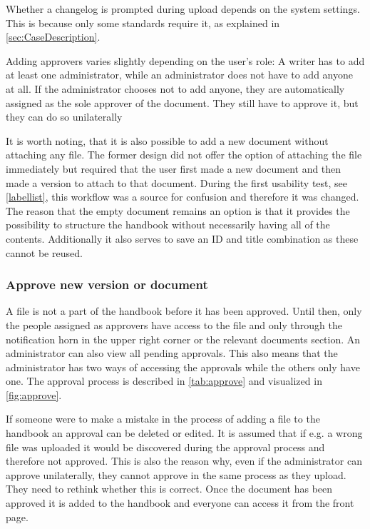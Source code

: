 


Whether a changelog is prompted during upload depends on the system settings.
This is because only some standards require it, as explained in \cref{sec:CaseDescription}.

Adding approvers varies slightly depending on the user's role:
A writer has to add at least one administrator, while an administrator does not have to add anyone at all.
If the administrator chooses not to add anyone, they are automatically assigned as the sole approver of the document.
They still have to approve it, but they can do so unilaterally

It is worth noting, that it is also possible to add a new document without attaching any file.
The former design did not offer the option of attaching the file immediately but required that the user first made a new document and then made a version to attach to that document.
During the first usability test, see \cref{labellist}, this workflow was a source for confusion and therefore it was changed.
The reason that the empty document remains an option is that it provides the possibility to structure the handbook without necessarily having all of the contents.
Additionally it also serves to save an ID and title combination as these cannot be reused. 

\subsubsection{Approve new version or document} \label{sec:approve}
A file is not a part of the handbook before it has been approved.
Until then, only the people assigned as approvers have access to the file and only through the notification horn in the upper right corner or the relevant documents section.
An administrator can also view all pending approvals.
This also means that the administrator has two ways of accessing the approvals while the others only have one.
The approval process is described in \cref{tab:approve} and visualized in \cref{fig:approve}.




If someone were to make a mistake in the process of adding a file to the handbook an approval can be deleted or edited.
It is assumed that if e.g. a wrong file was uploaded it would be discovered during the approval process and therefore not approved.
This is also the reason why, even if the administrator can approve unilaterally, they cannot approve in the same process as they upload.
They need to rethink whether this is correct.
Once the document has been approved it is added to the handbook and everyone can access it from the front page.

